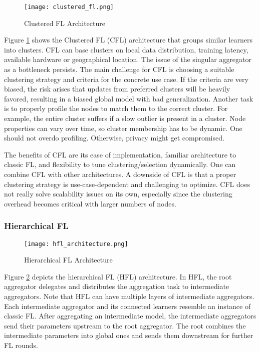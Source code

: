 \begin{figure}[h]
    \centering
    \texttt{[image: clustered\_fl.png]}
    \caption{Clustered FL Architecture}
    \label{fig:clustered_fl}
\end{figure}
Figure \ref{fig:clustered_fl} shows the Clustered FL (CFL) architecture
that groups similar learners into clusters.
CFL can base clusters on local data distribution, training latency, available hardware or geographical location.
The issue of the singular aggregator as a bottleneck persists.
The main challenge for CFL is choosing a suitable clustering strategy and criteria for the concrete use case.
If the criteria are very biased, the risk arises that updates from preferred clusters will be heavily favored, resulting in a biased global model with bad generalization.
Another task is to properly profile the nodes to match them to the correct cluster.
For example, the entire cluster suffers if a slow outlier is present in a cluster.
Node properties can vary over time, so cluster membership has to be dynamic.
One should not overdo profiling.
Otherwise, privacy might get compromised.

The benefits of CFL are its ease of implementation, familiar architecture to classic FL, and flexibility to tune clustering/selection dynamically.
One can combine CFL with other architectures.
A downside of CFL is that a proper clustering strategy is use-case-dependent and challenging to optimize.
CFL does not really solve scalability issues on its own, especially since the clustering overhead becomes critical with larger numbers of nodes.

\subsubsection{Hierarchical FL}
\begin{figure}[h]
    \centering
    \texttt{[image: hfl\_architecture.png]}
    \caption{Hierarchical FL Architecture}
    \label{fig:hfl_architecture}
\end{figure}
Figure \ref{fig:hfl_architecture} depicts the hierarchical FL (HFL) architecture.
In HFL, the root aggregator delegates and distributes the aggregation task to intermediate aggregators.
Note that HFL can have multiple layers of intermediate aggregators.
Each intermediate aggregator and its connected learners resemble an instance of classic FL.
After aggregating an intermediate model, the intermediate aggregators send their parameters upstream to the root aggregator.
The root combines the intermediate parameters into global ones and sends them downstream for further FL rounds.

